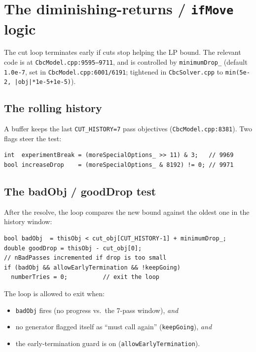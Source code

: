 \documentclass[11pt,a4paper]{article}
\begin{document}
\section{The diminishing-returns / \texttt{ifMove} logic}
\label{sec:ifmove}

The cut loop terminates early if cuts stop helping the LP bound.
The relevant code is at \texttt{CbcModel.cpp:9595--9711}, and is
controlled by \texttt{minimumDrop\_} (default \texttt{1.0e-7}, set in
\texttt{CbcModel.cpp:6001/6191}; tightened in
\texttt{CbcSolver.cpp} to
\texttt{min(5e-2,\,|obj|*1e-5+1e-5)}).

\subsection*{The rolling history}

A buffer keeps the last \texttt{CUT\_HISTORY=7} pass objectives
(\texttt{CbcModel.cpp:8381}).  Two flags steer the test:

\begin{lstlisting}
int  experimentBreak = (moreSpecialOptions_ >> 11) & 3;   // 9969
bool increaseDrop    = (moreSpecialOptions_ & 8192) != 0; // 9971
\end{lstlisting}

\subsection*{The badObj / goodDrop test}

After the resolve, the loop compares the new bound against the
oldest one in the history window:

\begin{lstlisting}
bool badObj  = thisObj < cut_obj[CUT_HISTORY-1] + minimumDrop_;
double goodDrop = thisObj - cut_obj[0];
// nBadPasses incremented if drop is too small
if (badObj && allowEarlyTermination && !keepGoing)
  numberTries = 0;          // exit the loop
\end{lstlisting}

The loop is allowed to exit when:
\begin{itemize}[leftmargin=*]
  \item \texttt{badObj} fires (no progress vs.\ the 7-pass window),
        \emph{and}
  \item no generator flagged itself as ``must call again''
        (\texttt{keepGoing}), \emph{and}
  \item the early-termination guard is on
        (\texttt{allowEarlyTermination}).
\end{itemize}
\end{document}
